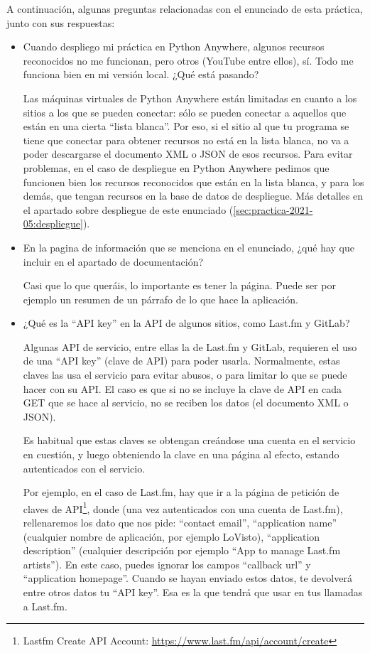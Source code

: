 A continuación, algunas preguntas relacionadas con el enunciado de esta práctica, junto con sus respuestas:

\begin{itemize}

\item Cuando despliego mi práctica en Python Anywhere, algunos recursos reconocidos no me funcionan, pero otros (YouTube entre ellos), sí. Todo me funciona bien en mi versión local. ¿Qué está pasando?

  Las máquinas virtuales de Python Anywhere están limitadas en cuanto a los sitios a los que se pueden conectar: sólo se pueden conectar a aquellos que están en una cierta ``lista blanca''. Por eso, si el sitio al que tu programa se tiene que conectar para obtener recursos no está en la lista blanca, no va a poder descargarse el documento XML o JSON de esos recursos. Para evitar problemas, en el caso de despliegue en Python Anywhere pedimos que funcionen bien los recursos reconocidos que están en la lista blanca, y para los demás, que tengan recursos en la base de datos de despliegue. Más detalles en el apartado sobre despliegue de este enunciado (\ref{sec:practica-2021-05:despliegue}).
  
\item En la pagina de información que se menciona en el enunciado, ¿qué hay que incluir en el apartado de documentación?

Casi que lo que queráis, lo importante es tener la página. Puede ser por ejemplo un resumen de un párrafo de lo que hace la aplicación.

\item ¿Qué es la ``API key'' en la API de algunos sitios, como Last.fm y GitLab?
\label{sec:practica-2021-05:preguntas-apikey}

  Algunas API de servicio, entre ellas la de Last.fm y GitLab, requieren el uso de una ``API key'' (clave de API) para poder usarla. Normalmente, estas claves las usa el servicio para evitar abusos, o para limitar lo que se puede hacer con su API. El caso es que si no se incluye la clave de API en cada GET que se hace al servicio, no se reciben los datos (el documento XML o JSON).

  Es habitual que estas claves se obtengan creándose una cuenta en el servicio en cuestión, y luego obteniendo la clave en una página al efecto, estando autenticados con el servicio.

  Por ejemplo, en el caso de Last.fm, hay que ir a la página de petición de claves de API\footnote{Lastfm Create API Account: \url{https://www.last.fm/api/account/create}}, donde (una vez autenticados con una cuenta de Last.fm), rellenaremos los dato que nos pide: ``contact email'', ``application name'' (cualquier nombre de aplicación, por ejemplo LoVisto), ``application description'' (cualquier descripción por ejemplo ``App to manage Last.fm artists''). En este caso, puedes ignorar los campos ``callback url'' y ``application homepage''. Cuando se hayan enviado estos datos, te devolverá entre otros datos tu ``API key''. Esa es la que tendrá que usar en tus llamadas a Last.fm.


\end{itemize}

